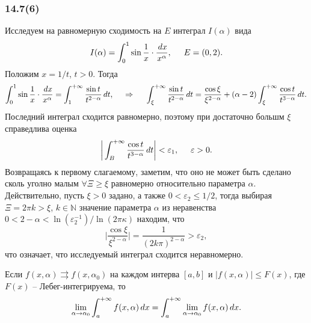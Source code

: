 \subsubsection*{14.7(6)}

Исследуем на равномерную сходимость на $E$ интеграл $I(\alpha)$ вида
\begin{equation*}
    I(\alpha) = \int_0^1 \sin \frac{1}{x} \cdot \frac{\, d x}{x^\alpha}, \hspace{5 mm} E = (0, 2).
\end{equation*}
Положим $x = 1/t$, $t > 0$. Тогда
\begin{equation*}
    \int_0^1 \sin \frac{1}{x} \cdot \frac{\, d x}{x^\alpha} = \int_1^{+\infty} \frac{\sin t}{t^{2-\alpha}} \, d t,
    \hspace{0.5cm} \Rightarrow \hspace{0.5cm}
    \int_\xi^{+\infty} \frac{\sin t}{t^{2-\alpha}} \, d t = 
    \frac{\cos \xi}{\xi^{2-\alpha}} + (\alpha-2) \int_{\xi}^{+\infty} \frac{\cos t}{t^{3-\alpha}} \, d t.
\end{equation*}
Последний интеграл \red{[!]} сходится равномерно, поэтому при достаточно большм $\xi$ справедлива оценка
\begin{equation*}
    \bigg|
        \int_B^{+\infty} \frac{\cos t}{t^{3-\alpha}} \, d t
    \bigg| < \varepsilon_1, \hspace{5 mm} \varepsilon > 0.
\end{equation*}
Возвращаясь к первому слагаемому, заметим, что оно не может быть сделано сколь уголно малым $\forall \Xi \geq \xi$ равномерно относительно параметра $\alpha$. Действительно, пусть $\xi > 0$ задано, а также $0 < \varepsilon_2 \leq 1/2$, тогда выбирая $\Xi = 2 \pi k > \xi$, $k \in \mathbb{N}$ значение параметра $\alpha$ из неравенства $0 < 2 - \alpha < \ln (\varepsilon_2^{-1}) / \ln (2 \pi \kappa)$ находим, что
\begin{equation*}
    \bigg|
        \frac{\cos \xi}{\xi^{2-\alpha}}
    \bigg| = \frac{1}{(2k\pi)^{2-\alpha}} > \varepsilon_2,
\end{equation*}
что означает, что исследуемый интеграл сходится неравномерно.



\begin{to_lem}
Если $f(x, \alpha) \rightrightarrows f(x, \alpha_0)$ на каждом интерва $[a, b]$ и $|f(x, \alpha)| \leq F(x)$, где $F(x)$ -- Лебег-интегрируема, то
\begin{equation*}
    \lim_{\alpha \to \alpha_0} \int_a^{+\infty} f(x, \alpha) \, d x = \int_a^{+\infty} \lim_{\alpha \to \alpha_0} f(x, \alpha) \, d x.
\end{equation*}    
\end{to_lem}

